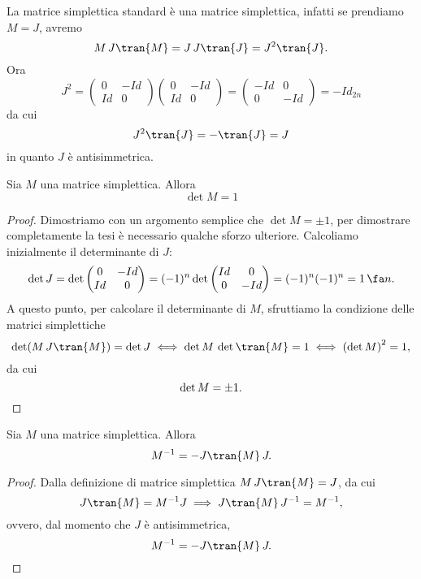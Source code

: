 \begin{oss}
	La matrice simplettica standard è una matrice simplettica, infatti se prendiamo \(M=J\), avremo
	\[
		M\,J \tran{M} = J\,J \tran{J} = J^2 \tran{J}.
	\]
	Ora
	\[
		J^2 = 	\begin{pmatrix}0 & -Id\\Id & 0\end{pmatrix}\begin{pmatrix}0 & -Id\\Id & 0\end{pmatrix} = \begin{pmatrix}-Id & 0\\0 & -Id\end{pmatrix} = -Id_{2n}
	\]
	da cui
	\[
		J^2 \tran{J} = -\tran{J} = J
	\]
	in quanto \(J\) è antisimmetrica.
\end{oss}

\begin{pr}
	Sia \(M\) una matrice simplettica. Allora
	\[
		\det M = 1
	\]
\end{pr}

\begin{proof}
	Dimostriamo con un argomento semplice che \(\det M = \pm 1\), per dimostrare completamente la tesi è necessario qualche sforzo ulteriore.
	Calcoliamo inizialmente il determinante di \(J\):
	\[
		\det J = \det \begin{pmatrix}0 & -Id\\Id & 0\end{pmatrix} = (-1)^n \det \begin{pmatrix}Id & 0\\0 & -Id\end{pmatrix} = (-1)^n (-1)^n = 1 \,\fa n.
	\]
	A questo punto, per calcolare il determinante di \(M\), sfruttiamo la condizione delle matrici simplettiche
	\[
		\det(M\,J \tran{M}) = \det J \iff \det M\,\det \tran{M} = 1 \iff {(\det M)}^2 = 1,
	\]
	da cui
	\[
		\det M = \pm 1. \qedhere
	\]
\end{proof}

\begin{pr}
	Sia \(M\) una matrice simplettica. Allora
	\[
		M^{-1} = -J \tran{M}\, J.
	\]
\end{pr}

\begin{proof}
	Dalla definizione di matrice simplettica \(M\,J \tran{M} = J\), da cui
	\[
		J \tran{M} = M^{-1} J \implies J \tran{M}\,J^{-1} = M^{-1},
	\]
	ovvero, dal momento che \(J\) è antisimmetrica,
	\[
		M^{-1} = -J \tran{M}\, J.\qedhere
	\]
\end{proof}


